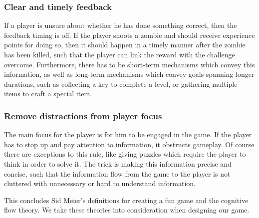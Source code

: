 \subsubsection{Clear and timely feedback}
If a player is unsure about whether he has done something correct, then the feedback timing is off.
If the player shoots a zombie and should receive experience points for doing so, then it should happen in a timely manner after the zombie has been killed, such that the player can link the reward with the challenge overcome.
Furthermore, there has to be short-term mechanisms which convey this information, as well as long-term mechanisms which convey goals spanning longer durations,
such as collecting a key to complete a level, or gathering multiple items to craft a special item.

\subsubsection{Remove distractions from player focus}\label{introductions:makingthegamefun:removedistractionsfromplayerfocus}
The main focus for the player is for him to be engaged in the game.
If the player has to stop up and pay attention to information, it obstructs gameplay.
Of course there are exceptions to this rule, like giving puzzles which require the player to think in order to solve it.
The trick is making this information precise and concise, such that the
information flow from the game to the player is not cluttered with unnecessary or hard to understand information.

This concludes Sid Meier's definitions for creating a fun game and the
cognitive flow theory.
We take these theories into consideration when designing our game.
